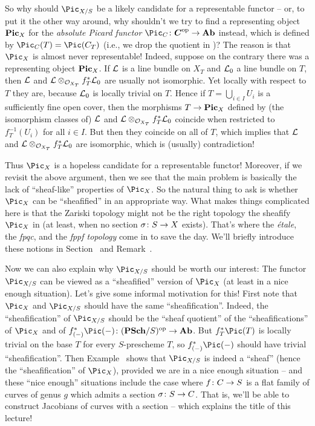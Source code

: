 \documentclass[a4paper,parskip=half,numbers=enddot, DIV=12]{scrreprt}
\begin{document}
So why should $\Pic_{X/S}$ be a likely candidate for a representable functor -- or, to put it the other way around, why shouldn't we try to find a representing object $\mathbf{Pic}_X$ for the \emph{absolute Picard functor} $\Pic_C\colon\cat{C}^\op\morphism\cat{Ab}$ instead, which is defined by $\Pic_C(T)=\Pic(C_T)$ (i.e., we drop the quotient in )? The reason is that $\Pic_X$ is almost never representable! Indeed, suppose on the contrary there was a representing object $\mathbf{Pic}_X$. If $\mathcal{L}$ is a line bundle on $X_T$ and $\mathcal{L}_0$ a line bundle on $T$, then $\mathcal{L}$ and $\mathcal{L}\otimes_{\mathcal{O}_{X_T}}f_T^*\mathcal{L}_0$ are usually not isomorphic. Yet locally with respect to $T$ they are, because $\mathcal{L}_0$ is locally trivial on $T$. Hence if $T=\bigcup_{i\in I}U_i$ is a sufficiently fine open cover, then the morphisms $T\morphism\PIC_X$ defined by (the isomorphism classes of) $\mathcal{L}$ and $\mathcal{L}\otimes_{\mathcal{O}_{X_T}}f_T^*\mathcal{L}_0$ coincide when restricted to $f_T^{-1}(U_i)$ for all $i\in I$. But then they coincide on all of $T$, which implies that $\mathcal{L}$ and $\mathcal{L}\otimes_{\mathcal{O}_{X_T}}f_T^*\mathcal{L}_0$ are isomorphic, which is (usually) contradiction!

Thus $\Pic_X$ is a hopeless candidate for a representable functor! Moreover, if we revisit the above argument, then we see that the main problem is basically the lack of ``sheaf-like'' properties of $\Pic_X$. So the natural thing to ask is whether $\Pic_X$ can be ``sheafified'' in an appropriate way. What makes things complicated here is that the Zariski topology might not be the right topology the sheafify $\Pic_X$ in (at least, when no section $\sigma\colon S\morphism X$ exists). That's where the \emph{étale}, the \emph{fpqc}, and the \emph{fppf topology} come in to save the day. We'll briefly introduce these notions in Section~ and Remark~.

Now we can also explain why $\Pic_{X/S}$ should be worth our interest: The functor $\Pic_{X/S}$ can be viewed as a ``sheafified'' version of $\Pic_X$ (at least in a nice enough situation). Let's give some informal motivation for this! First note that $\Pic_X$ and $\Pic_{X/S}$ should have the same ``sheafification''. Indeed, the ``sheafification'' of $\Pic_{X/S}$ should be the ``sheaf quotient'' of the ``sheafifications'' of $\Pic_X$ and of $f_{(-)}^*\Pic(-)\colon(\cat{PSch}/S)^\op\morphism\cat{Ab}$. But $f_T^*\Pic(T)$ is locally trivial on the base $T$ for every $S$-prescheme $T$, so $f_{(-)}^*\Pic(-)$ should have trivial ``sheafification''. Then Example~ shows that $\Pic_{X/S}$ is indeed a ``sheaf'' (hence the ``sheafification'' of $\Pic_X$), provided we are in a nice enough situation -- and these ``nice enough'' situations include the case where $f\colon C\morphism S$ is a flat family of curves of genus $g$ which admits a section $\sigma\colon S\morphism C$. That is, we'll be able to construct Jacobians of curves with a section -- which explains the title of this lecture!
\end{document}
